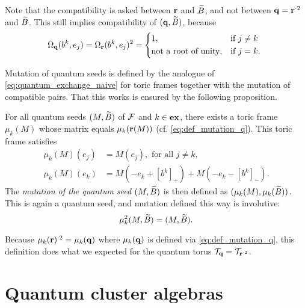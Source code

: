 \begin{remark}
	Note that the compatibility is asked between $\mathbf{r}$ and $\widetilde{B}$, and not between $\mathbf{q} = \mathbf{r}^{\cdot 2}$ and $\widetilde{B}$. This still implies compatibility of $(\mathbf{q}, \widetilde{B})$, because
	\begin{equation*}
		\Omega_\bbq(b^k, e_j) = \Omega_\bbr(b^k, e_j)^2 = \begin{dcases*}
			1,                          & if $j \neq k$ \\
			\text{not a root of unity}, & if $j = k$.
		\end{dcases*}
	\end{equation*}
\end{remark}

Mutation of quantum seeds is defined by the analogue of
\cref{eq:quantum_exchange_naive} for toric frames together with the mutation of
compatible pairs. That this works is ensured by the following proposition.
\begin{proposition}\label{prop:formula_for_mutation}

	For all quantum seeds $(M, \widetilde{B})$ of $\mathcal{F}$ and $k\in \mathbf{ex}$, there exists a toric frame
	$\mu_k(M)$ whose matrix equals $\mu_k(\mathbf{r}(M))$ (cf. \cref{eq:def_mutation_q}). This
	toric frame satisfies
	\begin{align*}
		\mu_k(M)(e_j) & = M(e_j), \text{ for all } j \neq k,         \\
		\mu_k(M)(e_k) & = M(-e_k + [b^k]_{+}) + M(-e_k - [b^k]_{-}).
	\end{align*}
	The \emph{mutation of the quantum seed} $(M, \widetilde{B})$ is then
	defined as $(\mu_k(M), \mu_k(\widetilde{B}))$. This is again a quantum seed, and mutation defined
	this way is involutive:
	\begin{equation*}
		\mu^2_k (M, \widetilde{B}) = (M, \widetilde{B}).
	\end{equation*}
\end{proposition}
\begin{remark}

	Because $\mu_k(\mathbf{r})^{\cdot 2} = \mu_k(\mathbf{q})$ where $\mu_k(\mathbf{q})$ is defined via
	\cref{eq:def_mutation_q}, this definition does what we expected for the quantum torus
	$\mathcal{T}_{\mathbf{q}} = \mathcal{T}_{\mathbf{r}^{\cdot 2}}$.
\end{remark}

\section{Quantum cluster algebras}

